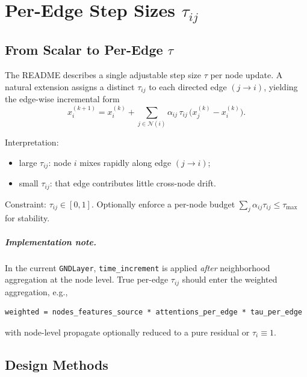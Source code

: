 \documentclass[11pt,a4paper]{report}
\begin{document}
\chapter{Per-Edge Step Sizes \texorpdfstring{$\tau_{ij}$}{tau\_ij}}

\section{From Scalar to Per-Edge \texorpdfstring{$\tau$}{tau}}

The README describes a single adjustable step size $\tau$ per node update. A natural extension assigns a distinct $\tau_{ij}$ to each directed edge $(j \to i)$, yielding the edge-wise incremental form
\begin{equation}
    x_i^{(k+1)} = x_i^{(k)} + \sum_{j \in \mathcal{N}(i)} \alpha_{ij}\, \tau_{ij}\, \bigl(x_j^{(k)} - x_i^{(k)}\bigr).
    \label{eq:edge-tau}
\end{equation}

Interpretation:
\begin{itemize}[noitemsep]
    \item large $\tau_{ij}$: node $i$ mixes rapidly along edge $(j \to i)$;
    \item small $\tau_{ij}$: that edge contributes little cross-node drift.
\end{itemize}

Constraint: $\tau_{ij} \in [0,1]$. Optionally enforce a per-node budget $\sum_j \alpha_{ij}\tau_{ij} \le \tau_{\max}$ for stability.

\paragraph{Implementation note.}
In the current \texttt{GNDLayer}, \texttt{time\_increment} is applied \emph{after} neighborhood aggregation at the node level. True per-edge $\tau_{ij}$ should enter the weighted aggregation, e.g.,
\begin{verbatim}
weighted = nodes_features_source * attentions_per_edge * tau_per_edge
\end{verbatim}
with node-level propagate optionally reduced to a pure residual or $\tau_i \equiv 1$.

\section{Design Methods}
\end{document}
